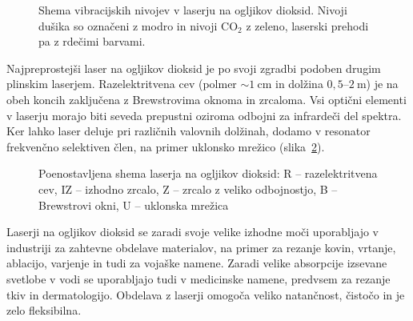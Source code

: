 \begin{figure}[ht]
\centering
\def\svgwidth{95truemm} 

\caption{Shema vibracijskih nivojev v laserju na ogljikov dioksid. 
Nivoji dušika so označeni z modro in nivoji CO$_2$ z zeleno, laserski prehodi 
pa z rdečimi barvami.}
\label{fig:CO2E}
\end{figure}

Najpreprostejši laser na ogljikov dioksid  
je po svoji zgradbi podoben drugim plinskim laserjem. 
Razelektritvena cev (polmer $\sim 1~\si{\centi\metre}$ in dolžina $0,5$--$2~\si{\metre}$) 
je na obeh koncih zaključena z Brewstrovima oknoma in zrcaloma. Vsi optični elementi
v laserju morajo biti seveda prepustni oziroma odbojni za infrardeči del spektra. Ker lahko 
laser deluje pri različnih valovnih dolžinah, dodamo v resonator frekvenčno selektiven
člen, na primer uklonsko mrežico (slika~\ref{fig:CO2S}).

\begin{figure}[ht]
\centering
\def\svgwidth{100truemm} 

\caption{Poenostavljena shema laserja na ogljikov dioksid: R -- razelektritvena cev, 
IZ -- izhodno zrcalo, Z -- zrcalo z veliko odbojnostjo, B -- Brewstrovi okni, 
U -- uklonska mrežica
}
\label{fig:CO2S}
\end{figure}

Laserji na ogljikov dioksid se zaradi svoje velike izhodne moči uporabljajo v 
industriji za zahtevne obdelave materialov, na primer za rezanje 
kovin, vrtanje, ablacijo, varjenje in tudi za vojaške namene. Zaradi velike
absorpcije izsevane svetlobe v vodi se uporabljajo tudi v medicinske namene, predvsem
za rezanje tkiv in dermatologijo. 
Obdelava z laserji omogoča veliko natančnost, čistočo in je zelo fleksibilna.

